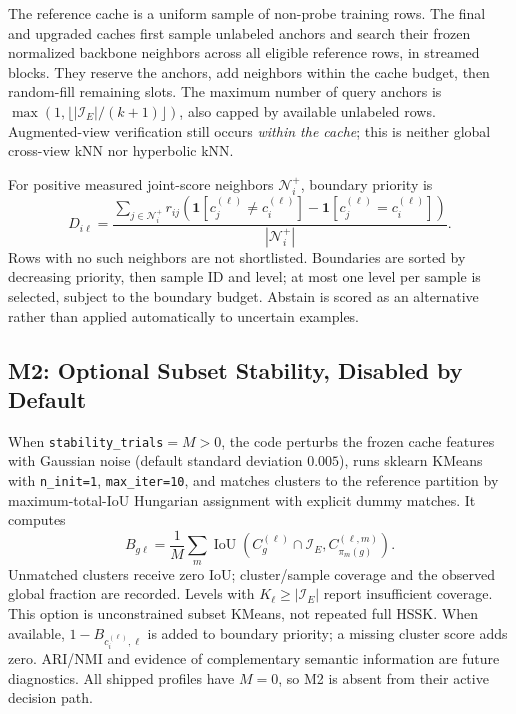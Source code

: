 \documentclass[conference]{IEEEtran}
\newcommand{\code}[1]{\texttt{#1}}
\newcommand{\ind}{\mathbf{1}}
\begin{document}
The reference cache is a uniform sample of non-probe training rows. The final and upgraded caches first sample unlabeled anchors and search their frozen normalized backbone neighbors across all eligible reference rows, in streamed blocks. They reserve the anchors, add neighbors within the cache budget, then random-fill remaining slots. The maximum number of query anchors is $\max(1,\lfloor |\mathcal I_E|/(k+1)\rfloor)$, also capped by available unlabeled rows. Augmented-view verification still occurs \emph{within the cache}; this is neither global cross-view kNN nor hyperbolic kNN.

For positive measured joint-score neighbors $\mathcal N_i^+$, boundary priority is
\begin{equation}
D_{i\ell}=\frac{\sum_{j\in\mathcal N_i^+}r_{ij}
\left(\ind[c_j^{(\ell)}\ne c_i^{(\ell)}]-\ind[c_j^{(\ell)}=c_i^{(\ell)}]\right)}{|\mathcal N_i^+|}.
\end{equation}
Rows with no such neighbors are not shortlisted. Boundaries are sorted by decreasing priority, then sample ID and level; at most one level per sample is selected, subject to the boundary budget. Abstain is scored as an alternative rather than applied automatically to uncertain examples.

\subsection{M2: Optional Subset Stability, Disabled by Default}
When \code{stability\_trials}$=M>0$, the code perturbs the frozen cache features with Gaussian noise (default standard deviation $0.005$), runs sklearn KMeans with \code{n\_init=1}, \code{max\_iter=10}, and matches clusters to the reference partition by maximum-total-IoU Hungarian assignment with explicit dummy matches. It computes
\begin{equation}
B_{g\ell}=\frac1M\sum_m\operatorname{IoU}
(C_g^{(\ell)}\cap\mathcal I_E,C_{\pi_m(g)}^{(\ell,m)}).
\end{equation}
Unmatched clusters receive zero IoU; cluster/sample coverage and the observed global fraction are recorded. Levels with $K_\ell\ge|\mathcal I_E|$ report insufficient coverage. This option is unconstrained subset KMeans, not repeated full HSSK. When available, $1-B_{c_i^{(\ell)},\ell}$ is added to boundary priority; a missing cluster score adds zero. ARI/NMI and evidence of complementary semantic information are future diagnostics. All shipped profiles have $M=0$, so M2 is absent from their active decision path.
\end{document}
